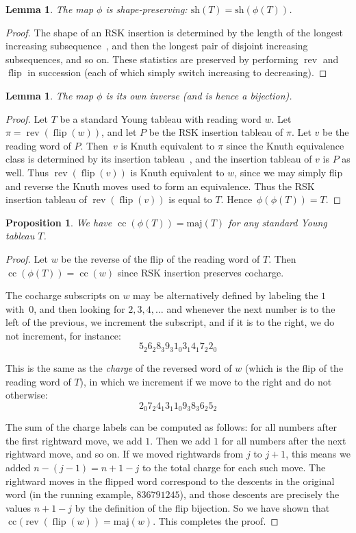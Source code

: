 \documentclass[11pt]{article}
\newtheorem{lemma}[theo]{Lemma}
\newtheorem{prop}[theo]{Proposition}
\theoremstyle{definition}
\numberwithin{equation}{section}
\DeclareMathOperator{\cc}{cc}
\DeclareMathOperator{\flip}{flip}
\DeclareMathOperator{\rev}{rev}
\newcommand{\sh}{\mathrm{sh}}
\newcommand{\maj}{\mathrm{maj}}
\begin{document}
\begin{lemma}
	The map $\phi$ is shape-preserving: $\sh(T)=\sh(\phi(T))$.
\end{lemma}
\begin{proof}
	The shape of an RSK insertion is determined by the length of the longest increasing subsequence~\cite{Fulton}, and then the longest pair of disjoint increasing subsequences, and so on.  These statistics are preserved by performing $\rev$ and $\flip$ in succession (each of which simply switch increasing to decreasing).      
\end{proof}

\begin{lemma}
	The map $\phi$ is its own inverse (and is hence a bijection).
\end{lemma}

\begin{proof}
	Let $T$ be a standard Young tableau with reading word $w$.  Let $\pi=\rev(\flip(w))$, and let $P$ be the RSK insertion tableau of $\pi$.  Let $v$ be the reading word of $P$.  Then~$v$ is Knuth equivalent to $\pi$ since the Knuth equivalence class is determined by its insertion tableau~\cite{Fulton}, and the insertion tableau of $v$ is $P$ as well.  Thus $\rev(\flip(v))$ is Knuth equivalent to $w$, since we may simply flip and reverse the Knuth moves used to form an equivalence. 
	Thus the RSK insertion tableau of $\rev(\flip(v))$ is equal to $T$.  Hence~$\phi(\phi(T))=T$.
\end{proof}

\begin{prop}
	We have $\cc(\phi(T))=\maj(T)$ for any standard Young tableau $T$.    
\end{prop}

\begin{proof}
	Let $w$ be the reverse of the flip of the reading word of $T$. Then $\cc(\phi(T))=\cc(w)$ since RSK insertion preserves cocharge.  
	
	The cocharge subscripts on $w$ may be alternatively defined by labeling the $1$ with~$0$, and then looking for $2,3,4,\ldots$ and whenever the next number is to the left of the previous, we increment the subscript, and if it is to the right, we do not increment, for instance:
	$$5_2 6_2 8_3 9_3 1_0 3_1 4_1 7_2 2_0$$
	
	This is the same as the \textit{charge} of the reversed word of $w$ (which is the flip of the reading word of $T$), in which we increment if we move to the right and do not otherwise:
	$$2_0 7_2 4_1 3_1 1_0 9_3 8_3 6_2 5_2$$
	
	The sum of the charge labels can be computed as follows: for all numbers after the first rightward move, we add $1$.  Then we add $1$ for all numbers after the next rightward move, and so on.  If we moved rightwards from $j$ to $j+1$, this means we added $n-(j-1)=n+1-j$ to the total charge for each such move.  The rightward moves in the flipped word correspond to the descents in the original word (in the running example, $836791245$), and those descents are precisely the values $n+1-j$ by the definition of the flip bijection.  So we have shown that $\cc(\rev(\flip(w))=\maj(w)$.  This completes the proof. 
\end{proof}
\end{document}
